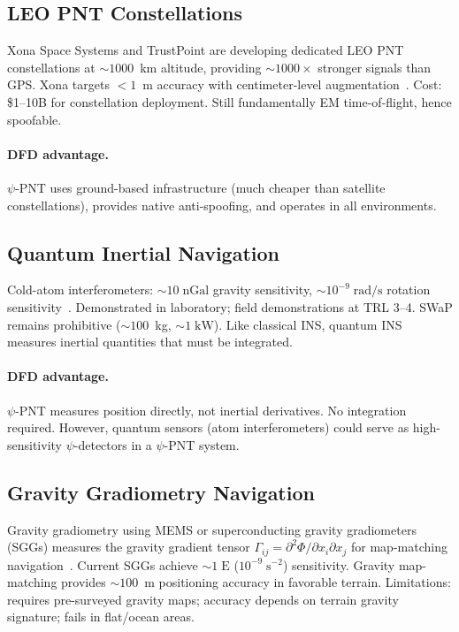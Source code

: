 \documentclass[twocolumn,superscriptaddress,prd,nofootinbib]{revtex4-2}
\begin{document}
\subsection{LEO PNT Constellations}

Xona Space Systems and TrustPoint are developing dedicated LEO PNT
constellations at $\sim 1000$~km altitude, providing $\sim 1000\times$
stronger signals than GPS. Xona targets $< 1$~m accuracy with
centimeter-level augmentation~\cite{Reid2020XonaLEO}. Cost: \$1--10B
for constellation deployment. Still fundamentally EM time-of-flight,
hence spoofable.

\paragraph{DFD advantage.}
$\psi$-PNT uses ground-based infrastructure (much cheaper than satellite
constellations), provides native anti-spoofing, and operates in all
environments.

\subsection{Quantum Inertial Navigation}

Cold-atom interferometers: $\sim 10\;\text{nGal}$ gravity sensitivity,
$\sim 10^{-9}\;\text{rad/s}$ rotation
sensitivity~\cite{Geiger2020AtomInterferometry}. Demonstrated in
laboratory; field demonstrations at TRL 3--4. SWaP remains prohibitive
($\sim 100$~kg, $\sim 1\;\text{kW}$). Like classical INS, quantum INS
measures inertial quantities that must be integrated.

\paragraph{DFD advantage.}
$\psi$-PNT measures position directly, not inertial derivatives. No
integration required. However, quantum sensors (atom interferometers)
could serve as high-sensitivity $\psi$-detectors in a $\psi$-PNT system.

\subsection{Gravity Gradiometry Navigation}

Gravity gradiometry using MEMS or superconducting gravity gradiometers
(SGGs) measures the gravity gradient tensor
$\Gamma_{ij} = \partial^2\Phi/\partial x_i\partial x_j$ for map-matching
navigation~\cite{Jekeli2006Gravimetry}. Current SGGs achieve
$\sim 1\;\text{E}$ ($10^{-9}\;\text{s}^{-2}$) sensitivity. Gravity
map-matching provides $\sim 100$~m positioning accuracy in favorable
terrain. Limitations: requires pre-surveyed gravity maps; accuracy
depends on terrain gravity signature; fails in flat/ocean areas.
\end{document}
